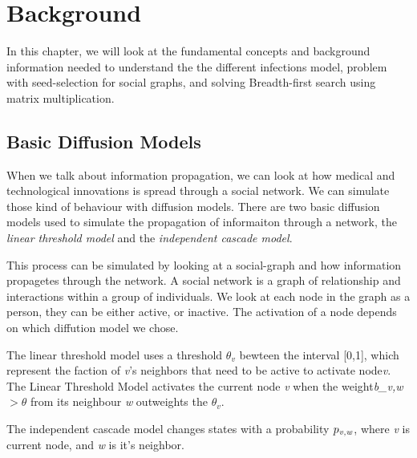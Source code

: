 \chapter{Background} 

In this chapter, we will look at the fundamental concepts and background information needed to understand the the different infections model, problem with seed-selection for social graphs, and solving Breadth-first search using matrix multiplication.

\section{Basic Diffusion Models}
When we talk about information propagation, we can look at how medical and technological innovations is spread through a social network. We can simulate those kind of behaviour with diffusion models. There are two basic diffusion models used to simulate the propagation of informaiton through a network\cite{kempe}, the {\it linear threshold model} and the {\it independent cascade model}\cite{kempe}.

This process can be simulated by looking at a social-graph and how information propagetes through the network. A social network is a graph of relationship and interactions within a group of individuals. 
We look at each node in the graph as a person, they can be either active, or inactive. The activation of a node depends on which diffution model we chose.

The linear threshold model uses a threshold $\theta_v$ bewteen the interval [0,1], which represent the faction of {\it v}'s neighbors that need to be active to activate node{\it v}. The Linear Threshold Model activates the current node {\it v} when the weight{\it b_{v,w}} $> \theta$ from its neighbour {\it w} outweights the $\theta_v$. 

The independent cascade model changes states with a probability $p_{\it v, w}$, where {\it v }is current node, and {\it w} is it's neighbor. 